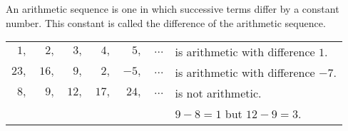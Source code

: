 \begin{frame}
\begin{definition}
An arithmetic sequence is one in which successive terms differ by a constant number.  
This constant is called the difference of the arithmetic sequence.  
\end{definition}

\begin{example}
\begin{tabular}{rrrrrcl}
$ 1,$ & $ 2,$ & $ 3,$ & $ 4,$ & $ 5,$ & $\ldots$ & is arithmetic with difference $1$. \\
$23,$ & $16,$ & $ 9,$ & $ 2,$ & $-5,$ & $\ldots$ & is arithmetic with difference $-7$. \\
$ 8,$ & $ 9,$ & $12,$ & $17,$ & $24,$ & $\ldots$ & is not arithmetic. \\
& & & & & & $9-8=1$ but $12-9=3$.
\end{tabular}
\end{example}
\end{frame}
